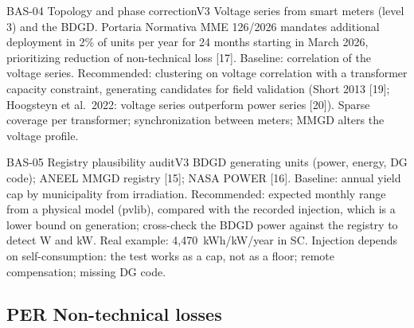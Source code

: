\begin{ficha}{BAS-04 \textperiodcentered{} Topology and phase correction}{V3}
 Voltage series from smart meters (level 3) and the BDGD.
Portaria Normativa MME 126/2026 mandates additional deployment in 2\% of
units per year for 24 months starting in March 2026, prioritizing reduction
of non-technical loss [17].
 Baseline: correlation of the voltage series.
Recommended: clustering on voltage correlation with a transformer capacity
constraint, generating candidates for field validation
(Short 2013 [19]; Hoogsteyn et al.\ 2022: voltage series outperform
power series [20]).
 Sparse coverage per transformer; synchronization between
meters; MMGD alters the voltage profile.
\end{ficha}

\begin{ficha}{BAS-05 \textperiodcentered{} Registry plausibility audit}{V3}
 BDGD generating units (power, energy, DG code);
ANEEL MMGD registry [15]; NASA POWER [16].
 Baseline: annual yield cap by municipality
from irradiation. Recommended: expected monthly range from a physical model
(pvlib), compared with the recorded injection, which is a lower bound on generation;
cross-check the BDGD power against the registry to detect W and kW. Real example:
4,470~kWh/kW/year in SC.
 Injection depends on self-consumption: the test works as a cap,
not as a floor; remote compensation; missing DG code.
\end{ficha}

\subsection{PER \textperiodcentered{} Non-technical losses}

